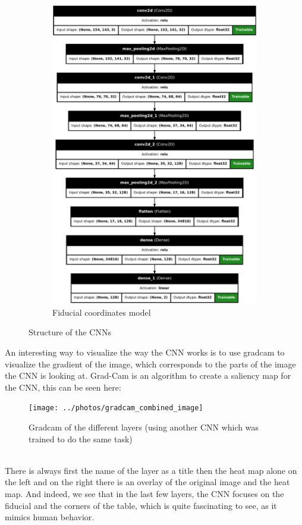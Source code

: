 \begin{figure}[H]
\begin{subfigure}{.5\textwidth}
        \includegraphics[width=.8\textwidth]{../photos/fiducial_coords_model}
        \caption[originalRainbow]{Fiducial coordinates model}
        \label{fig:fiducial_coords_model}
    \end{subfigure}
    \caption{Structure of the CNNs}
    \label{fig:CNN_structure}
\end{figure}
An interesting way to visualize the way the CNN works is to use gradcam\autocite{Selvaraju_2019} to visualize the gradient of the image, which corresponds to the parts of the image the CNN is looking at.
Grad-Cam is an algorithm to create a saliency map for the CNN, this can be seen here:
\begin{figure}[H]
    \centering
    \texttt{[image: ../photos/gradcam\_combined\_image]}
    \caption[cnn-gradcam]{Gradcam of the different layers (using another CNN which was trained to do the same task)}
    \label{fig:gradcam_combined_image}
\end{figure}\\
There is always first the name of the layer as a title then the heat map alone on the left and on the right there is an overlay of the original image and the heat map.
And indeed, we see that in the last few layers, the CNN focuses on the fiducial and the corners of the table, which is quite fascinating to see, as it mimics human behavior.

